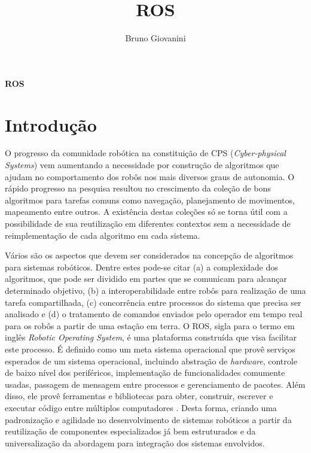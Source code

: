 \documentclass[a4paper, 12pt]{article}
\author{Bruno Giovanini}
\title{ROS}
\begin{document}
\begin{large}


\textbf{ROS}

\vspace{1.5cm}


\end{large}



\newpage


\section{Introdução}

O progresso da comunidade robótica na constituição de CPS (\textit{Cyber-physical Systems}) vem aumentando a necessidade por construção de algoritmos que ajudam no comportamento dos robôs nos mais diversos graus de autonomia. O rápido progresso na pesquisa resultou no crescimento da coleção de bons algoritmos para tarefas comuns como navegação, planejamento de movimentos, mapeamento entre outros. A existência destas coleções só se torna útil com a possibilidade de sua reutilização em diferentes contextos sem a necessidade de reimplementação de cada algoritmo em cada sistema.

Vários são os aspectos que devem ser considerados na concepção de algoritmos para sistemas robóticos. Dentre estes pode-se citar (a) a complexidade dos algoritmos, que pode ser dividido em partes que se comunicam para alcançar determinado objetivo, (b) a interoperabilidade entre robôs para realização de uma tarefa compartilhada, (c) concorrência entre processos do sistema que precisa ser analisado e (d) o tratamento de comandos enviados pelo operador em tempo real para os robôs a partir de uma estação em terra.  O ROS, sigla para o termo em inglês \textit{Robotic Operating System}, é uma plataforma construída que visa facilitar este processo. É definido como um meta sistema operacional que provê serviços esperados de um sistema operacional, incluindo abstração de \textit{hardware}, controle de baixo nível dos periféricos, implementação de funcionalidades comumente usadas, passagem de mensagem entre processos e gerenciamento de pacotes. Além disso, ele provê ferramentas e bibliotecas para obter, construir, escrever e executar código entre múltiplos computadores \cite{ROS}.
Desta forma, criando uma padronização e agilidade no desenvolvimento de sistemas robóticos a partir da reutilização de componentes especializados já bem estruturados e da universalização da abordagem para integração dos sistemas envolvidos. 
\end{document}
